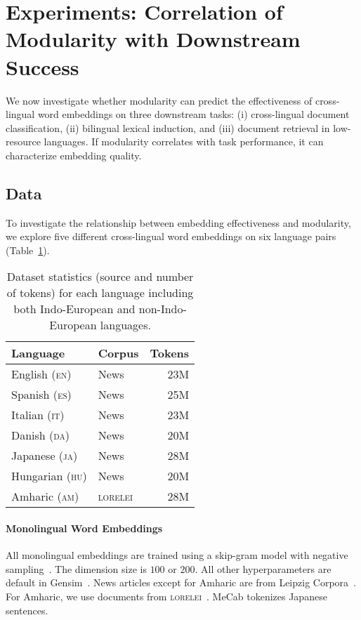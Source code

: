 \section{Experiments: Correlation of Modularity with Downstream Success}
\label{sec:experiment}

We now investigate whether
modularity can predict the effectiveness of cross-lingual word embeddings
on three downstream tasks: (i) cross-lingual document classification,
(ii) bilingual lexical induction, and (iii) document retrieval in
low-resource languages.
If modularity correlates with task
performance, it can characterize embedding quality.


\subsection{Data}

To investigate the relationship between embedding effectiveness and
modularity, we explore five different cross-lingual word embeddings
on six language pairs (Table~\ref{tab:stats_mono}).


\begin{table}[!tb]
\centering
\small
 \begin{tabular}{llr}
\bf Language  & \bf Corpus                      & \bf Tokens        \\ \hline
     English (\textsc{en})   & News             & 23M             \\
     Spanish (\textsc{es})   & News             & 25M             \\
     Italian (\textsc{it})   & News             & 23M             \\
     Danish (\textsc{da})    & News             & 20M             \\
     Japanese (\textsc{ja})  & News             & 28M             \\
     Hungarian (\textsc{hu}) & News             & 20M             \\
     Amharic (\textsc{am})   & \textsc{lorelei} & 28M             \\
 \hline
 \end{tabular}
\caption{\label{tab:stats_mono}Dataset statistics
         (source and number of tokens) for each language
         including both Indo-European and
         non-Indo-European languages.
 }
\end{table}


\paragraph{Monolingual Word Embeddings}
All monolingual embeddings  are
trained using a skip-gram model with negative
sampling~\citep{NIPS2013_5021}.  The dimension size is $100$ or
$200$.
All other hyperparameters are default in
Gensim~\cite{rehurek_lrec}.
 News articles except for Amharic are from Leipzig Corpora~\citep{Goldhahn12buildinglarge}.
 For Amharic, we use
documents from \textsc{lorelei}~\citep{LORELEI_lang_packs}.
MeCab \citep{kudo-yamamoto-matsumoto:2004:EMNLP} tokenizes
Japanese sentences.

